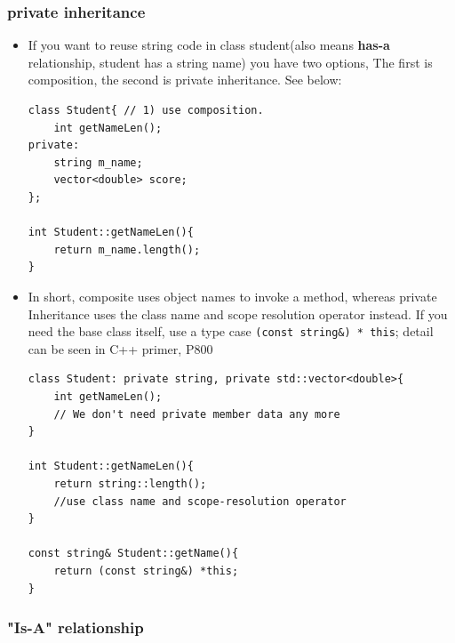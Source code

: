 \documentclass[a4paper,11pt,twoside]{book}
\begin{document}
\subsubsection{private inheritance}
\begin{itemize}
    \item If you want to reuse string code in class student(also means \textbf{has-a} relationship, student has a string name) you have two options, The first is composition,  the second is private inheritance. See below:
\begin{lstlisting}[numbers=none]
class Student{ // 1) use composition.
	int getNameLen();
private:
	string m_name;
	vector<double> score;
};

int Student::getNameLen(){
	return m_name.length();
}
\end{lstlisting}

\item In short, composite uses object names to invoke a method, whereas private Inheritance uses the class name and scope resolution operator instead. If you need the base class itself, use a type case \texttt{(const string\&) * this}; detail can be seen in C++ primer, P800
\begin{lstlisting}[numbers=none]
class Student: private string, private std::vector<double>{
	int getNameLen();
	// We don't need private member data any more
}

int Student::getNameLen(){
	return string::length();
	//use class name and scope-resolution operator
}

const string& Student::getName(){
	return (const string&) *this;
}
\end{lstlisting}
\end{itemize}

\subsubsection{"Is-A" relationship}
\end{document}
